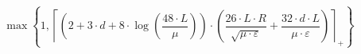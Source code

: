 \[\max\left\{ 1, \left\lceil \left(2 + 3 \cdot d + 8 \cdot \log\left(\frac{48 \cdot L}{\mu}\right)\right) \cdot \left(\frac{26 \cdot L \cdot R}{\sqrt{\mu \cdot \varepsilon}} + \frac{32 \cdot d \cdot L}{\mu \cdot \varepsilon}\right) \right\rceil_{+} \right\}\]
